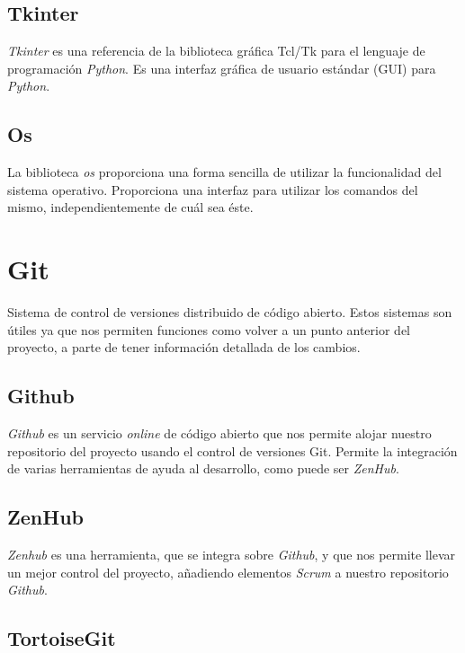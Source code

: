 \subsection{Tkinter}

\textit{Tkinter} es una referencia de la biblioteca gráfica Tcl/Tk para el lenguaje de programación \textit{Python}. Es una interfaz gráfica de usuario estándar (GUI) para \textit{Python}.

\subsection{Os}

La biblioteca \textit{os} proporciona una forma sencilla de utilizar la funcionalidad del sistema operativo. Proporciona una interfaz para utilizar los comandos del mismo, independientemente de cuál sea éste.

\section{Git}

Sistema de control de versiones distribuido de código abierto. Estos sistemas son útiles ya que nos permiten funciones como volver a un punto anterior del proyecto, a parte de tener información detallada de los cambios.

\subsection{Github}

\textit{Github} es un servicio \textit{online} de código abierto que nos permite alojar nuestro repositorio del proyecto usando el control de versiones Git. Permite la integración de varias herramientas de ayuda al desarrollo, como puede ser \textit{ZenHub}.

\subsection{ZenHub}

\textit{Zenhub} es una herramienta, que se integra sobre \textit{Github}, y que nos permite llevar un mejor control del proyecto, añadiendo elementos \textit{Scrum} a nuestro repositorio \textit{Github}.

\subsection{TortoiseGit}

